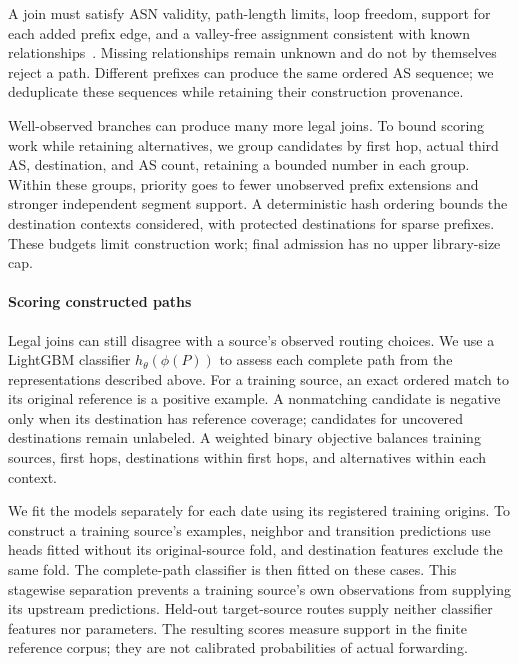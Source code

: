 A join must satisfy ASN validity, path-length limits, loop freedom,
support for each added prefix edge, and a valley-free assignment
consistent with known relationships~\cite{gao2001inferring}. Missing
relationships remain unknown and do not by themselves reject a path.
Different prefixes can produce the same ordered AS sequence; we
deduplicate these sequences while retaining their construction provenance.

Well-observed branches can produce many more legal joins. To bound
scoring work while retaining alternatives, we group candidates by first
hop, actual third AS, destination, and AS count, retaining a bounded
number in each group. Within these groups,
priority goes to fewer unobserved prefix extensions and stronger
independent segment support. A deterministic hash ordering bounds the
destination contexts considered, with protected destinations for sparse
prefixes. These budgets limit construction work; final admission has no
upper library-size cap.

\paragraph{Scoring constructed paths}
Legal joins can still disagree with a source's observed routing choices.
We use a LightGBM classifier $h_\theta(\phi(P))$ to assess each complete
path from the representations described above. For a training source,
an exact ordered match to its original reference is a positive example.
A nonmatching candidate is negative only when its destination has
reference coverage; candidates for uncovered destinations remain
unlabeled. A weighted binary objective balances training sources, first
hops, destinations within first hops, and alternatives within each
context.

We fit the models separately for each date using its registered training
origins. To construct a training source's examples, neighbor and
transition predictions use heads fitted without its original-source
fold, and destination features exclude the same fold. The complete-path
classifier is then fitted on these cases. This stagewise separation
prevents a training source's own observations from supplying its upstream
predictions. Held-out target-source routes supply neither classifier
features nor parameters. The resulting scores measure support in the
finite reference corpus; they are not calibrated probabilities of
actual forwarding.

